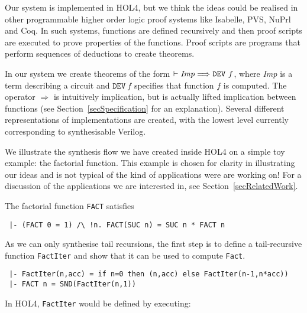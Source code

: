 
Our system is implemented in HOL4, but we think the ideas could be
realised in other programmable higher order logic proof systems like
Isabelle, PVS, NuPrl and Coq. In such systems, functions are defined
recursively and then proof scripts are executed to prove properties of
the functions.  Proof scripts are programs that perform sequences of
deductions to create theorems.

In our system we create theorems of the form $\vdash
{\it{Imp}}\Longrightarrow\texttt{DEV}~f$, where {\it{Imp}} is a term
describing a circuit and $\texttt{DEV}~f$ specifies that function $f$
is computed. The operator $\Longrightarrow$ is intuitively
implication, but is actually lifted implication between functions (see
Section~\ref{secSpecification} for an explanation).
Several different representations of implementations are
created, with the lowest level currently corresponding to
synthesisable Verilog.

We illustrate the synthesis flow we have created inside HOL4 on a
simple toy example: the factorial function. This example is chosen for
clarity in illustrating our ideas and is not typical of the kind of
applications were are working on!  For a discussion of the
applications we are interested in, see Section~\ref{secRelatedWork}.

The factorial function \texttt{FACT} satisfies

\vspace*{-2mm}

{\baselineskip10pt\begin{verbatim}
 |- (FACT 0 = 1) /\ !n. FACT(SUC n) = SUC n * FACT n
\end{verbatim}}

\vspace*{-2mm}
As we can only synthesise tail recursions, the first
step is to define a tail-recursive function \texttt{FactIter} and show
that it can be used to compute \texttt{Fact}.

\vspace*{-2mm}

{\baselineskip10pt\begin{verbatim}
 |- FactIter(n,acc) = if n=0 then (n,acc) else FactIter(n-1,n*acc))
 |- FACT n = SND(FactIter(n,1))
\end{verbatim}}

\vspace*{-2mm}

\noindent In HOL4, \texttt{FactIter} would be defined by executing:

\vspace*{-2mm}

